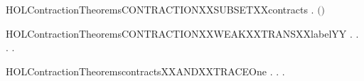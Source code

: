 \newcommand{\HOLContractionTheoremsCONTRACTIONXXEPSYY}{\UseVerbatim{HOLContractionTheoremsCONTRACTIONXXEPSYY}}
\begin{SaveVerbatim}{HOLContractionTheoremsCONTRACTIONXXSUBSETXXcontracts}
\HOLTokenTurnstile{} \HOLSymConst{\HOLTokenForall{}}.   \HOLSymConst{\HOLTokenImp{}}   \ensuremath{(}\ensuremath{)}
\end{SaveVerbatim}
\newcommand{\HOLContractionTheoremsCONTRACTIONXXSUBSETXXcontracts}{\UseVerbatim{HOLContractionTheoremsCONTRACTIONXXSUBSETXXcontracts}}
\begin{SaveVerbatim}{HOLContractionTheoremsCONTRACTIONXXWEAKXXTRANSXXlabelYY}
\HOLTokenTurnstile{} \HOLSymConst{\HOLTokenForall{}}.
         \HOLSymConst{\HOLTokenImp{}}
       \HOLSymConst{\HOLTokenForall{}} .
              \HOLSymConst{\HOLTokenImp{}}
           \HOLSymConst{\HOLTokenForall{}} .
                \HOLTokenWeakTransBegin{} \HOLTokenWeakTransEnd {} \HOLSymConst{\HOLTokenImp{}}
               \HOLSymConst{\HOLTokenExists{}}.  \HOLTokenWeakTransBegin{} \HOLTokenWeakTransEnd {} \HOLSymConst{\HOLTokenConj{}}   
\end{SaveVerbatim}
\newcommand{\HOLContractionTheoremsCONTRACTIONXXWEAKXXTRANSXXlabelYY}{\UseVerbatim{HOLContractionTheoremsCONTRACTIONXXWEAKXXTRANSXXlabelYY}}
\begin{SaveVerbatim}{HOLContractionTheoremscontractsXXANDXXTRACEOne}
\HOLTokenTurnstile{} \HOLSymConst{\HOLTokenForall{}} .
          \HOLSymConst{\HOLTokenImp{}}
       \HOLSymConst{\HOLTokenForall{}} .
               \HOLSymConst{\HOLTokenImp{}}
           \HOLSymConst{\HOLTokenExists{}} .     \HOLSymConst{\HOLTokenConj{}}   
\end{SaveVerbatim}
